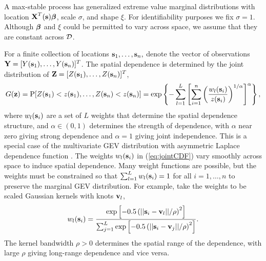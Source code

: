 \documentclass[11pt]{article}
\begin{document}




A max-stable process has generalized extreme value marginal distributions with location $\mbox{\bf X}^T(\mbox{\bf s}) \mbox{\boldmath $\beta$}$, scale $\sigma$, and shape $\xi$.
For identifiability purposes we fix $\sigma = 1$.
Although $\mbox{\boldmath $\beta$}$ and $\xi$ could be permitted to vary across space, we assume that they are constant across ${\cal D}$.

For a finite collection of locations $\mbox{\bf s}_1, \ldots, \mbox{\bf s}_n,$ denote the vector of observations $\mbox{\bf Y} = [Y(\mbox{\bf s}_1), \ldots, Y(\mbox{\bf s}_n)]^T$.
The spatial dependence is determined by the joint distribution of $\mbox{\bf Z} = [Z(\mbox{\bf s}_1),\ldots, Z(\mbox{\bf s}_n)]^T$,
\begin{align}\label{eq:jointCDF}
  G(\mbox{\bf z}) = \mbox{P}[Z(\mbox{\bf s}_1) < z(\mbox{\bf s}_1), \ldots, Z(\mbox{\bf s}_n) < z(\mbox{\bf s}_n)] = \exp\left\{-\sum_{l=1}^L\left[\sum_{i=1}^n\left(\frac{w_{l}(\mbox{\bf s}_i)}{z(\mbox{\bf s}_i)}\right)^{1/\alpha}\right]^{\alpha}\right\},
\end{align}
where $w_{l}(\mbox{\bf s}_i)$ are a set of $L$ weights that determine the spatial dependence structure, and $\alpha\in(0,1)$ determines the strength of dependence, with $\alpha$ near zero giving strong dependence and $\alpha=1$ giving joint independence.
This is a special case of the multivariate GEV distribution with asymmetric Laplace dependence function \citep{Tawn1990}.
The weights $w_{l}(\mbox{\bf s}_i)$ in (\ref{eq:jointCDF}) vary smoothly across space to induce spatial dependence.
Many weight functions are possible, but the weights must be constrained so that $\sum_{l=1}^L w_{l}(\mbox{\bf s}_i)=1$ for all $i=1,\ldots,n$ to preserve the marginal GEV distribution.
For example, \cite{Reich2012} take the weights to be scaled Gaussian kernels with knots $\mbox{\bf v}_l$,
\begin{align}\label{w}
   w_{l}(\mbox{\bf s}_i) = \frac{\exp\left[-0.5\left(||\mbox{\bf s}_i-\mbox{\bf v}_l||/\rho\right)^2\right]}
                 {\sum_{j=1}^L\exp\left[-0.5\left(||\mbox{\bf s}_i-\mbox{\bf v}_j||/\rho\right)^2\right]}.
\end{align}
The kernel bandwidth $\rho>0$ determines the spatial range of the dependence, with large $\rho$ giving long-range dependence and vice versa.
\end{document}
